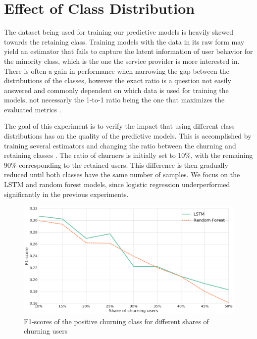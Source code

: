 \documentclass{kththesis}
\begin{document}
\section{Effect of Class Distribution}

The dataset being used for training our predictive models is heavily skewed towards the retaining class. Training models with the data in its raw form may yield an estimator that fails to capture the latent information of user behavior for the minority class, which is the one the service provider is more interested in. There is often a gain in performance when narrowing the gap between the distributions of the classes, however the exact ratio is a question not easily answered and commonly dependent on which data is used for training the models, not necessarly the 1-to-1 ratio being the one that maximizes the evaluated metrics \cite{Burez2009}.

The goal of this experiment is to verify the impact that using different class distributions has on the quality of the predictive models. This is accomplished by training several estimators and changing the ratio between the churning and retaining classes . The ratio of churners is initially set to 10\%, with the remaining 90\% corresponding to the retained users. This difference is then gradually reduced until both classes have the same number of samples. We focus on the LSTM and random forest models, since logistic regression underperformed significantly in the previous experiments.

\begin{figure}
    \centering
    \includegraphics[width=1.0\textwidth,keepaspectratio]{figures/line_class_balance.pdf}
    \caption{F1-scores of the positive churning class for different shares of churning users}
    \label{fig:line_class_balance}
\end{figure}
\end{document}
